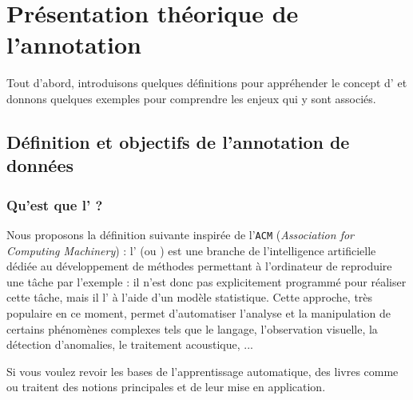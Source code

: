 \section{Présentation théorique de l'annotation}
\label{section:2.1-PRESENTATION-ANNOTATION}

	Tout d'abord, introduisons quelques définitions pour appréhender le concept d' et donnons quelques exemples pour comprendre les enjeux qui y sont associés.
	
	
	\subsection{Définition et objectifs de l'annotation de données}
	\label{section:2.1.1-PRESENTATION-ANNOTATION-DEFINITION}
	
		\subsubsection{Qu'est que l' ?}
		\label{section:2.1.1.A-PRESENTATION-ANNOTATION-DEFINITION-MACHINE-LEARNING}
			
			Nous proposons la définition suivante inspirée de l'\texttt{ACM} (\textit{Association for Computing Machinery}) : l' (ou ) est une branche de l'intelligence artificielle dédiée au développement de méthodes permettant à l'ordinateur de reproduire une tâche par l'exemple : il n'est donc pas explicitement programmé pour réaliser cette tâche, mais il l' à l'aide d'un modèle statistique.
			Cette approche, très populaire en ce moment, permet d'automatiser l'analyse et la manipulation de certains phénomènes complexes tels que le langage, l'observation visuelle, la détection d'anomalies, le traitement acoustique, ...
			
			\begin{leftBarInformation}
				Si vous voulez revoir les bases de l'apprentissage automatique, des livres comme \cite{zhou:2021:machine-learning} ou \cite{raschka-mirjalili:2019:python-machine-learning} traitent des notions principales et de leur mise en application.
			\end{leftBarInformation}
			
